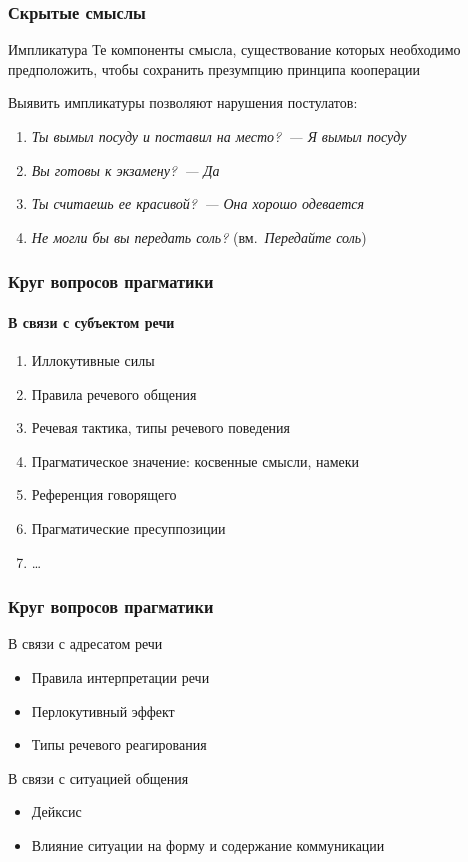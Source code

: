 \begin{frame}
  \frametitle{Скрытые смыслы}

  \begin{exampleblock}{Импликатура}
    Те компоненты смысла, существование которых необходимо предположить,
    чтобы сохранить презумпцию принципа кооперации
  \end{exampleblock}

  \vfill

  Выявить импликатуры позволяют нарушения постулатов: \begin{enumerate}
    \item \textit{Ты вымыл посуду и поставил на место?~--- Я вымыл посуду}
    \item \textit{Вы готовы к экзамену?~--- Да}
    \item \textit{Ты считаешь ее красивой?~--- Она хорошо одевается}
    \item \textit{Не могли бы вы передать соль?} (вм.\ \textit{Передайте соль})
  \end{enumerate}
\end{frame}

\begin{frame}
  \frametitle{Круг вопросов прагматики}
  \framesubtitle{В связи с субъектом речи}

  \begin{enumerate}
    \item Иллокутивные силы
    \item Правила речевого общения
    \item Речевая тактика, типы речевого поведения
    \item Прагматическое значение: косвенные смысли, намеки
    \item Референция говорящего
    \item Прагматические пресуппозиции
    \item \ldots
  \end{enumerate}
\end{frame}

\begin{frame}
  \frametitle{Круг вопросов прагматики}

  \begin{block}{В связи с адресатом речи}
    \begin{itemize}
      \item Правила интерпретации речи
      \item Перлокутивный эффект
      \item Типы речевого реагирования
    \end{itemize}
  \end{block}

  \begin{block}{В связи с ситуацией общения}
    \begin{itemize}
      \item Дейксис
      \item Влияние ситуации на форму и содержание коммуникации
    \end{itemize}
  \end{block}
\end{frame}

